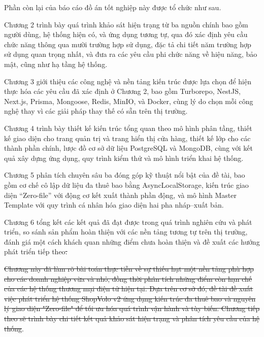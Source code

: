 \documentclass[../main.tex]{subfiles}
\providecommand{\DIFdel}[1]{{\protect\color{red}\sout{#1}}} %
\providecommand{\DIFdelbegin}{} %
\providecommand{\DIFdelend}{} %
\begin{document}
Phần còn lại của báo cáo đồ án tốt nghiệp này được tổ chức như sau.

Chương 2 trình bày quá trình khảo sát hiện trạng từ ba nguồn chính bao gồm người dùng, hệ thống hiện có, và ứng dụng tương tự, qua đó xác định yêu cầu chức năng thông qua mười trường hợp sử dụng, đặc tả chi tiết năm trường hợp sử dụng quan trọng nhất, và đưa ra các yêu cầu phi chức năng về hiệu năng, bảo mật, cũng như hạ tầng hệ thống.

Chương 3 giới thiệu các công nghệ và nền tảng kiến trúc được lựa chọn để hiện thực hóa các yêu cầu đã xác định ở Chương 2, bao gồm Turborepo, NestJS, Next.js, Prisma, Mongoose, Redis, MinIO, và Docker, cùng lý do chọn mỗi công nghệ thay vì các giải pháp thay thế có sẵn trên thị trường.

Chương 4 trình bày thiết kế kiến trúc tổng quan theo mô hình phân tầng, thiết kế giao diện cho trang quản trị và trang hiển thị cửa hàng, thiết kế lớp cho các thành phần chính, lược đồ cơ sở dữ liệu PostgreSQL và MongoDB, cùng với kết quả xây dựng ứng dụng, quy trình kiểm thử và mô hình triển khai hệ thống.

Chương 5 phân tích chuyên sâu ba đóng góp kỹ thuật nổi bật của đề tài, bao gồm cơ chế cô lập dữ liệu đa thuê bao bằng AsyncLocalStorage, kiến trúc giao diện ``Zero-file'' với động cơ kết xuất thành phần động, và mô hình Master Template với quy trình cá nhân hóa giao diện hai pha nháp--xuất bản.

Chương 6 tổng kết các kết quả đã đạt được trong quá trình nghiên cứu và phát triển, so sánh sản phẩm hoàn thiện với các nền tảng tương tự trên thị trường, đánh giá một cách khách quan những điểm chưa hoàn thiện và đề xuất các hướng phát triển tiếp theo\DIFdelbegin \DIFdel{.
}%

\DIFdel{Chương này đã làm rõ bài toán thực tiễn về sự thiếu hụt một nền tảng phù hợp cho các doanh nghiệp vừa và nhỏ, đồng thời phân tích những điểm còn hạn chế của các hệ thống thương mại điện tử hiện tại. Dựa trên cơ sở đó, đề tài đề xuất việc phát triển hệ thống ShopVolo v2 ứng dụng kiến trúc đa thuê bao và nguyên lý giao diện "Zero-file" để tối ưu hóa quá trình vận hành và tùy biến. Chương tiếp theo sẽ trình bày chi tiết kết quả khảo sát hiện trạng và phân tích yêu cầu của hệ thống}\DIFdelend .
\end{document}
